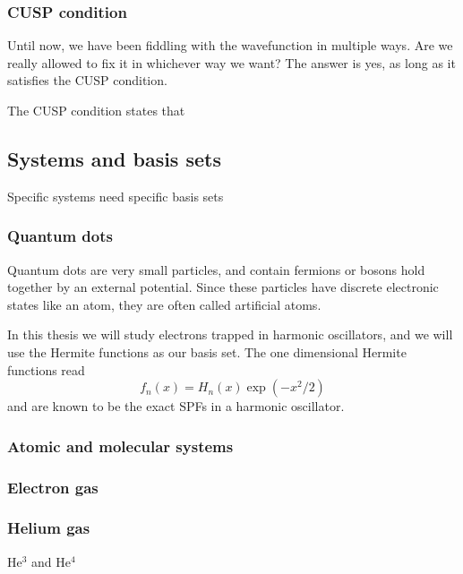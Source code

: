 \subsubsection{CUSP condition} \label{subsubsec:cusp}
Until now, we have been fiddling with the wavefunction in multiple ways. Are we really allowed to fix it in  whichever way we want? The answer is yes, as long as it satisfies the CUSP condition. 

The CUSP condition states that 

\subsection{Systems and basis sets} \label{subsec:potentials}
Specific systems need specific basis sets

\subsubsection{Quantum dots} \label{subsubsec:quantumdots}
Quantum dots are very small particles, and contain fermions or bosons hold together by an external potential. Since these particles have discrete electronic states like an atom, they are often called artificial atoms. 

In this thesis we will study electrons trapped in harmonic oscillators, and we will use the Hermite functions as our basis set. The one dimensional Hermite functions read
\begin{equation}
f_n(x)=H_n(x)\exp(-x^2/2)
\end{equation}
and are known to be the exact SPFs in a harmonic oscillator. 

\subsubsection{Atomic and molecular systems} \label{subsubsec:atomic}
\subsubsection{Electron gas} \label{subsubsec:electrongas}
\subsubsection{Helium gas} \label{subsubsec:heliumgas}
He$^3$ and He$^4$

